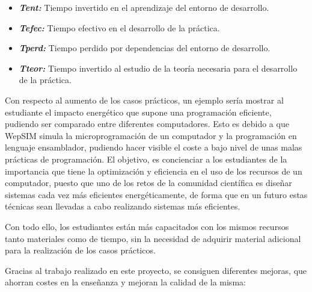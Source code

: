 \begin{itemize}

\item \textbf{\textit{Tent:}} Tiempo invertido en el aprendizaje del entorno de desarrollo.

\item \textbf{\textit{Tefec:}} Tiempo efectivo en el desarrollo de la práctica.

\item \textbf{\textit{Tperd:}} Tiempo perdido por dependencias del entorno de desarrollo.

\item \textbf{\textit{Tteor:}} Tiempo invertido al estudio de la teoría necesaria para el desarrollo de la práctica.

\end{itemize}

Con respecto al aumento de los casos prácticos, un ejemplo sería mostrar al estudiante el impacto energético que supone una programación eficiente, pudiendo ser comparado entre diferentes computadores. Esto es debido a que WepSIM simula la microprogramación de un computador y la programación en lenguaje ensamblador, pudiendo hacer visible el coste a bajo nivel de unas malas prácticas de programación. El objetivo, es concienciar a los estudiantes de la importancia que tiene la optimización y eficiencia en el uso de los recursos de un computador, puesto que uno de los retos de la comunidad científica es diseñar sistemas cada vez más eficientes energéticamente, de forma que en un futuro estas técnicas sean llevadas a cabo realizando sistemas más eficientes.

Con todo ello, los estudiantes están más capacitados con los mismos recursos tanto materiales como de tiempo, sin la necesidad de adquirir material adicional para la realización de los casos prácticos.


\iffalse
Gracias al trabajo realizado en este proyecto, se consiguen diferentes mejoras, que ahorran costes en la enseñanza y mejoran la calidad de la misma:


